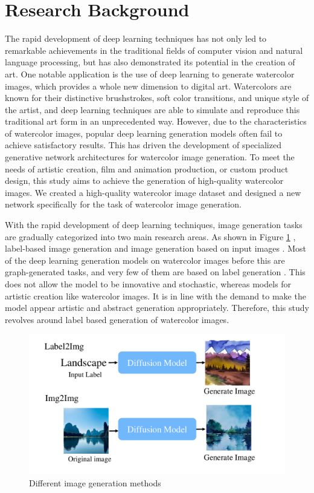 \documentclass[12pt]{report}
\begin{document}
\section{Research Background}
The rapid development of deep learning techniques has not only led to remarkable achievements in the traditional fields of computer vision and natural language processing, but has also demonstrated its potential in the creation of art. One notable application is the use of deep learning to generate watercolor images, which provides a whole new dimension to digital art. Watercolors are known for their distinctive brushstrokes, soft color transitions, and unique style of the artist, and deep learning techniques are able to simulate and reproduce this traditional art form in an unprecedented way. However, due to the characteristics of watercolor images, popular deep learning generation models often fail to achieve satisfactory results. This has driven the development of specialized generative network architectures for watercolor image generation. To meet the needs of artistic creation, film and animation production, or custom product design, this study aims to achieve the generation of high-quality watercolor images. We created a high-quality watercolor image dataset and designed a new network specifically for the task of watercolor image generation.

With the rapid development of deep learning techniques, image generation tasks are gradually categorized into two main research areas. As shown in Figure \ref{fig:intro} , label-based image generation and image generation based on input images \cite{isola2017image}. Most of the deep learning generation models on watercolor images before this are graph-generated tasks, and very few of them are based on label generation \cite{wang2023stroke}. This does not allow the model to be innovative and stochastic, whereas models for artistic creation like watercolor images. It is in line with the demand to make the model appear artistic and abstract generation appropriately. Therefore, this study revolves around label based generation of watercolor images.

\begin{figure}[h]
    \centering
    \includegraphics[width=14cm]{image/intro.pdf}
    \caption{Different image generation methods}
    \label{fig:intro}
\end{figure}
\end{document}
